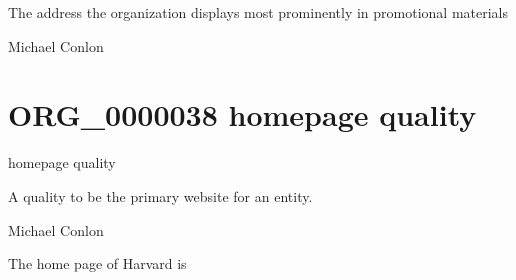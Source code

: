 \documentclass[letterpaper,10pt,english]{sphinxmanual}
\begin{document}
\begin{sphinxShadowBox}

\sphinxAtStartPar
The address the organization displays most prominently in promotional materials
\end{sphinxShadowBox}

\begin{sphinxShadowBox}

\sphinxAtStartPar
Michael Conlon 
\end{sphinxShadowBox}
\begin{quote}
\label{\detokenize{doc-ORG_0000038:org-0000038}}\label{\detokenize{doc-ORG_0000038:homepage-quality}}\label{\detokenize{doc-ORG_0000038:org-0000038}}
\ignorespaces \end{quote}


\section{ORG\_0000038 \sphinxhyphen{} homepage quality}
\label{\detokenize{doc-ORG_0000038:org-0000038-homepage-quality}}\label{\detokenize{doc-ORG_0000038:index-0}}\label{\detokenize{doc-ORG_0000038::doc}}
\begin{sphinxShadowBox}

\sphinxAtStartPar
homepage quality
\end{sphinxShadowBox}

\begin{sphinxShadowBox}

\sphinxAtStartPar
A quality to be the primary website for an entity.
\end{sphinxShadowBox}

\begin{sphinxShadowBox}

\sphinxAtStartPar
Michael Conlon 
\end{sphinxShadowBox}

\begin{sphinxShadowBox}

\sphinxAtStartPar
The home page of Harvard is 
\end{sphinxShadowBox}
\end{document}
